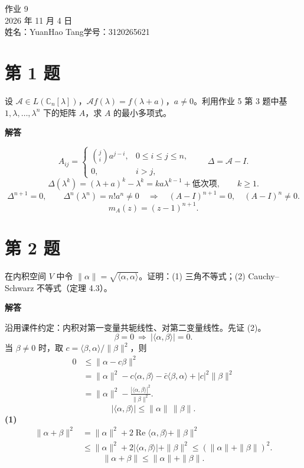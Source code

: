 \documentclass[UTF8,10pt,letterpaper,fontset=fandol]{ctexart}
\newcommand{\C}{\mathbb C}
\newcommand{\ip}[2]{\langle #1,#2\rangle}
\begin{document}
\begin{center}
{\LARGE 作业 9}\\[0.5em]
2026 年 11 月 4 日\\[0.25em]
姓名：YuanHao Tang\quad 学号：3120265621
\end{center}
\section{第 1 题}
设 $\mathcal A\in L(\C_n[\lambda])$，$\mathcal A f(\lambda)=f(\lambda+a)$，$a\ne0$。利用作业 5 第 3 题中基 $1,\lambda,\ldots,\lambda^n$ 下的矩阵 $A$，求 $A$ 的最小多项式。
\par{}\textbf{解答}\par
\[
 A_{ij}=\begin{cases}\binom ji a^{j-i},&0\le i\le j\le n,\\0,&i>j,\end{cases}
 \qquad \Delta=\mathcal A-I.
\]
\[
 \Delta(\lambda^k)=(\lambda+a)^k-\lambda^k
 =ka\lambda^{k-1}+\text{低次项},\qquad k\ge1.
\]
\[
 \Delta^{n+1}=0,\qquad \Delta^n(\lambda^n)=n!a^n\ne0
 \quad\Longrightarrow\quad (A-I)^{n+1}=0,\quad(A-I)^n\ne0.
\]
\[
 \boxed{m_A(z)=(z-1)^{n+1}}.
\]
\section{第 2 题}
在内积空间 $V$ 中令 $\|\alpha\|=\sqrt{\ip\alpha\alpha}$。证明：(1) 三角不等式；(2) Cauchy--Schwarz 不等式（定理 4.3）。
\par{}\textbf{解答}\par
沿用课件约定：内积对第一变量共轭线性、对第二变量线性。先证 (2)。
\[
 \beta=0\ \Longrightarrow\ |\ip\alpha\beta|=0.
\]
当 $\beta\ne0$ 时，取 $c=\ip\beta\alpha/\|\beta\|^2$，则
\begin{align*}
 0&\le\|\alpha-c\beta\|^2\\
  &=\|\alpha\|^2-c\ip\alpha\beta-\bar c\ip\beta\alpha+|c|^2\|\beta\|^2\\
  &=\|\alpha\|^2-\frac{|\ip\alpha\beta|^2}{\|\beta\|^2}.
\end{align*}
\[
 \boxed{|\ip\alpha\beta|\le\|\alpha\|\,\|\beta\|}.
\]
\textbf{(1)}
\begin{align*}
 \|\alpha+\beta\|^2
 &=\|\alpha\|^2+2\operatorname{Re}\ip\alpha\beta+\|\beta\|^2\\
 &\le\|\alpha\|^2+2|\ip\alpha\beta|+\|\beta\|^2
 \le(\|\alpha\|+\|\beta\|)^2.
\end{align*}
\[
 \boxed{\|\alpha+\beta\|\le\|\alpha\|+\|\beta\|}.
\]
\newpage
\end{document}
